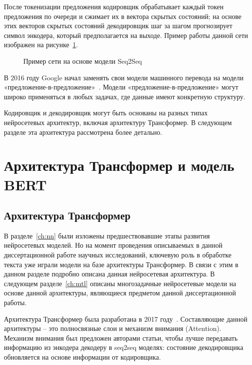 После токенизации предложения кодировщик обрабатывает каждый токен предложения по очереди и сжимает их в вектора скрытых состояний; на основе этих векторов скрытых состояний декодировщик шаг за шагом прогнозирует символ энкодера, который предполагается на выходе. Пример работы данной сети изображен на рисунке~\ref{fig:Neuro6-Seq2Seq}.

\begin{figure}[ht]
 \caption{Пример сети на основе модели Seq2Seq}\label{fig:Neuro6-Seq2Seq}
\end{figure}

В 2016 году Google начал заменять свои модели машинного перевода на модели «предложение-в-предложение»~\cite{google_replace}. Модели «предложение-в-предложение» могут широко применяться в любых задачах, где данные имеют конкретную структуру.
  
Кодировщик и декодировщик могут быть основаны на разных типах нейросетевых архитектур, включая архитектуру Трансформер. В следующем разделе эта архитектура рассмотрена более детально.

\section{Архитектура Трансформер и модель BERT}\label{ch:tr}

\subsection{Архитектура Трансформер}

В разделе~\ref{ch:nn} были изложены предшествовавшие этапы развития нейросетевых моделей. Но на момент проведения описываемых в данной диссертационной работе научных исследований, ключевую роль в обработке текста уже играли модели на базе архитектуры Трансформер. В связи с этим в данном разделе подробно описана данная нейросетевая архитектура. В следующем разделе~\ref{ch:mtl} описаны многозадачные нейросетевые модели на основе данной архитектуры, являющиеся предметом данной диссертационной работы. 

Архитектура Трансформер была разработана в 2017 году~\cite{vaswani_2017}. Составляющие данной архитектуры -- это полносвязные слои и механизм внимания (Attention). Механизм внимания был предложен авторами статьи, чтобы лучше передавать информацию из энкодера декодеру в seq2seq моделях: состояние декодировщика обновляется на основе информации от кодировщика.

